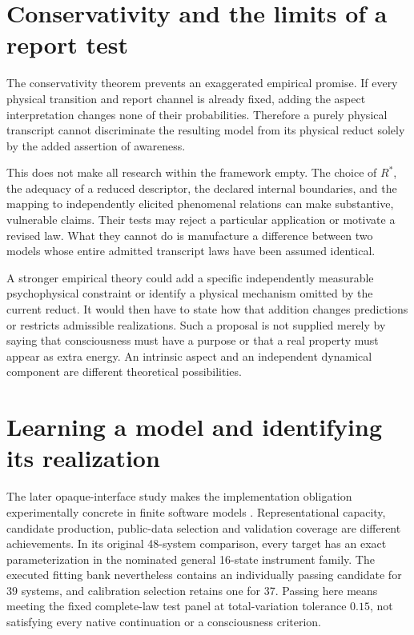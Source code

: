 \section{Conservativity and the limits of a report test}\label{section:evidence:conservativity-and-the-limits-of-a-report-test}
The conservativity theorem prevents an exaggerated empirical promise. If every physical transition and report channel is already fixed, adding the aspect interpretation changes none of their probabilities. Therefore a purely physical transcript cannot discriminate the resulting model from its physical reduct solely by the added assertion of awareness.

This does not make all research within the framework empty. The choice of $R^\ast$, the adequacy of a reduced descriptor, the declared internal boundaries, and the mapping to independently elicited phenomenal relations can make substantive, vulnerable claims. Their tests may reject a particular application or motivate a revised law. What they cannot do is manufacture a difference between two models whose entire admitted transcript laws have been assumed identical.

A stronger empirical theory could add a specific independently measurable psychophysical constraint or identify a physical mechanism omitted by the current reduct. It would then have to state how that addition changes predictions or restricts admissible realizations. Such a proposal is not supplied merely by saying that consciousness must have a purpose or that a real property must appear as extra energy. An intrinsic aspect and an independent dynamical component are different theoretical possibilities.

\section{Learning a model and identifying its realization}
\label{sec:update-interface-learning}
The later opaque-interface study makes the implementation obligation experimentally concrete in finite software models \cite{RodgersLearning2026}. Representational capacity, candidate production, public-data selection and validation coverage are different achievements. In its original 48-system comparison, every target has an exact parameterization in the nominated general 16-state instrument family. The executed fitting bank nevertheless contains an individually passing candidate for 39 systems, and calibration selection retains one for 37. Passing here means meeting the fixed complete-law test panel at total-variation tolerance $0.15$, not satisfying every native continuation or a consciousness criterion.

